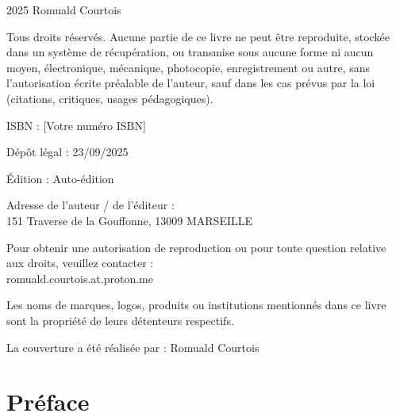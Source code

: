 \documentclass[12pt,a4paper]{book}
\begin{document}
\begin{center}
2025 Romuald Courtois

\bigskip

Tous droits réservés. Aucune partie de ce livre ne peut être reproduite, stockée dans un système de récupération, ou transmise sous aucune forme ni aucun moyen, électronique, mécanique, photocopie, enregistrement ou autre, sans l'autorisation écrite préalable de l'auteur, sauf dans les cas prévus par la loi (citations, critiques, usages pédagogiques).

\bigskip

ISBN : [Votre numéro ISBN]

\bigskip

Dépôt légal : 23/09/2025

\bigskip

Édition : Auto-édition

\bigskip

Adresse de l'auteur / de l'éditeur :\\
151 Traverse de la Gouffonne, 13009 MARSEILLE

\bigskip

Pour obtenir une autorisation de reproduction ou pour toute question relative aux droits, veuillez contacter :\\
romuald.courtois.at.proton.me

\bigskip

Les noms de marques, logos, produits ou institutions mentionnés dans ce livre sont la propriété de leurs détenteurs respectifs.

\bigskip

La couverture a été réalisée par : Romuald Courtois
\end{center}

\newpage

\section{Préface}
\end{document}
